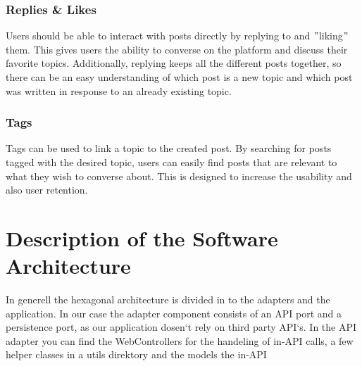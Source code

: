 \documentclass[a4paper, 11pt]{article}
\begin{document}
    \subsubsection{Replies \& Likes}
    Users should be able to interact with posts directly by replying to and \("\)liking\("\) them. This gives users the ability to converse on the platform and discuss their favorite topics. Additionally, replying keeps all the different posts together, so there can be an easy understanding of which post is a new topic and which post was written in response to an already existing topic.

    \subsubsection{Tags}
    Tags can be used to link a topic to the created post. By searching for posts tagged with the desired topic, users can easily find posts that are relevant to what they wish to converse about. This is designed to increase the usability and also user retention.




    \section{Description of the Software Architecture}\label{sec:description-of-the-software-architecture}
In generell the hexagonal architecture is divided in to the adapters and the application. In our case the adapter component consists of an API port and a persistence port, as our application dosen`t rely on third party  API`s. In the API adapter you can find the WebControllers for the handeling of in-API calls, a few helper classes in a utils direktory and the models the in-API 

\end{document}
